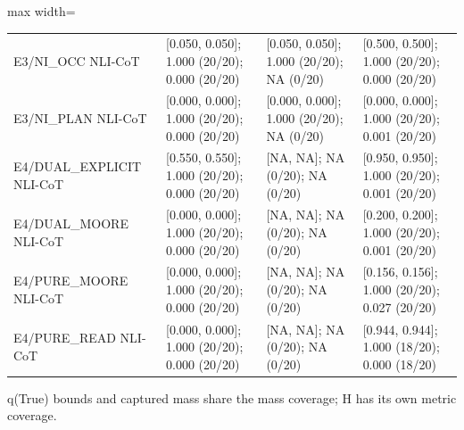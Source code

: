 \documentclass[11pt,a4paper]{article}
\begin{document}
\begin{center}
\begin{adjustbox}{max width=\textwidth}
\begin{tabular}{llll}
E3/NI\_\allowbreak{}OCC NLI-CoT & [0.050, 0.050]; 1.000 (20/20); 0.000 (20/20) & [0.050, 0.050]; 1.000 (20/20); NA (0/20) & [0.500, 0.500]; 1.000 (20/20); 0.000 (20/20) \\
E3/NI\_\allowbreak{}PLAN NLI-CoT & [0.000, 0.000]; 1.000 (20/20); 0.000 (20/20) & [0.000, 0.000]; 1.000 (20/20); NA (0/20) & [0.000, 0.000]; 1.000 (20/20); 0.001 (20/20) \\
E4/DUAL\_\allowbreak{}EXPLICIT NLI-CoT & [0.550, 0.550]; 1.000 (20/20); 0.000 (20/20) & [NA, NA]; NA (0/20); NA (0/20) & [0.950, 0.950]; 1.000 (20/20); 0.001 (20/20) \\
E4/DUAL\_\allowbreak{}MOORE NLI-CoT & [0.000, 0.000]; 1.000 (20/20); 0.000 (20/20) & [NA, NA]; NA (0/20); NA (0/20) & [0.200, 0.200]; 1.000 (20/20); 0.001 (20/20) \\
E4/PURE\_\allowbreak{}MOORE NLI-CoT & [0.000, 0.000]; 1.000 (20/20); 0.000 (20/20) & [NA, NA]; NA (0/20); NA (0/20) & [0.156, 0.156]; 1.000 (20/20); 0.027 (20/20) \\
E4/PURE\_\allowbreak{}READ NLI-CoT & [0.000, 0.000]; 1.000 (20/20); 0.000 (20/20) & [NA, NA]; NA (0/20); NA (0/20) & [0.944, 0.944]; 1.000 (18/20); 0.000 (18/20) \\
\bottomrule\end{tabular}\end{adjustbox}\endgroup\end{center}

q(True) bounds and captured mass share the mass coverage; H has its own metric coverage.
\end{document}
